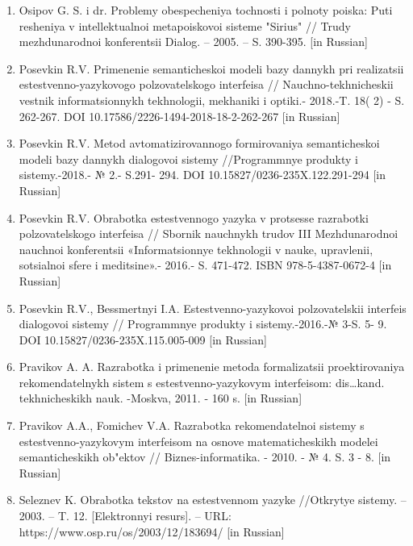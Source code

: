 \begin{noparindent}
\begin{enumerate}
  komp\textquotesingle yuternaya lingvistika // M.: URSS. -- 2016 -- 315
  c. ISBN 978-5-9710-3472-8 {[}in Russian{]}
\item
  Osipov G. S. i dr. Problemy obespecheniya tochnosti i polnoty poiska:
  Puti resheniya v intellektual\textquotesingle noi metapoiskovoi
  sisteme "Sirius" // Trudy mezhdunarodnoi konferentsii Dialog. -- 2005.
  -- S. 390-395. {[}in Russian{]}
\item
  Posevkin R.V. Primenenie semanticheskoi modeli bazy dannykh pri
  realizatsii estestvenno-yazykovogo
  pol\textquotesingle zovatel\textquotesingle skogo interfeisa //
  Nauchno-tekhnicheskii vestnik informatsionnykh tekhnologii, mekhaniki
  i optiki.- 2018.-T. 18( 2) - S. 262-267. DOI 10.17586/2226-1494-2018-18-2-262-267 {[}in Russian{]}

\item
  Posevkin R.V. Metod avtomatizirovannogo formirovaniya semanticheskoi
  modeli bazy dannykh dialogovoi sistemy //Programmnye produkty i
  sistemy.-2018.- № 2.- S.291- 294. DOI 10.15827/0236-235X.122.291-294 {[}in Russian{]}

\item
  Posevkin R.V. Obrabotka estestvennogo yazyka v protsesse razrabotki
  pol\textquotesingle zovatel\textquotesingle skogo interfeisa //
  Sbornik nauchnykh trudov III Mezhdunarodnoi nauchnoi konferentsii
  «Informatsionnye tekhnologii v nauke, upravlenii,
  sotsial\textquotesingle noi sfere i meditsine».- 2016.- S. 471-472.
  ISBN 978-5-4387-0672-4 {[}in Russian{]}
\item
  Posevkin R.V., Bessmertnyi I.A. Estestvenno-yazykovoi
  pol\textquotesingle zovatel\textquotesingle skii interfeis dialogovoi
  sistemy // Programmnye produkty i sistemy.-2016.-№ 3-S. 5- 9. DOI 10.15827/0236-235X.115.005-009 {[}in Russian{]}

\item
  Pravikov A. A. Razrabotka i primenenie metoda formalizatsii
  proektirovaniya rekomendatel\textquotesingle nykh sistem s
  estestvenno-yazykovym interfeisom: dis\ldots kand. tekhnicheskikh
  nauk. -Moskva, 2011. - 160 s. {[}in Russian{]}
\item
  Pravikov A.A., Fomichev V.A. Razrabotka
  rekomendatel\textquotesingle noi sistemy s estestvenno-yazykovym
  interfeisom na osnove matematicheskikh modelei semanticheskikh
  ob"ektov // Biznes-informatika. - 2010. - № 4. S. 3 - 8. {[}in
  Russian{]}
\item
  Seleznev K. Obrabotka tekstov na estestvennom yazyke //Otkrytye
  sistemy. -- 2003. -- T. 12. {[}Elektronnyi resurs{]}. -- URL:
  https://www.osp.ru/os/2003/12/183694/ {[}in Russian{]}
\end{enumerate}

\end{noparindent}


